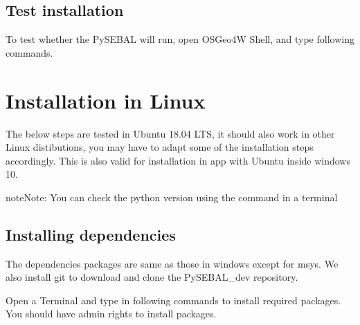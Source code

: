\documentclass[letterpaper,10pt,english]{sphinxmanual}
\begin{document}
\subsection{Test installation}
\label{\detokenize{installation:test-installation}}
To test whether the PySEBAL will run, open OSGeo4W Shell, and type following commands.

\begin{sphinxVerbatim}[commandchars=\\\{\},numbers=left,firstnumber=1,stepnumber=1]
 \PYGZbs{}
 
\end{sphinxVerbatim}


\section{Installation in Linux}
\label{\detokenize{installation:installation-in-linux}}
The below steps are tested in Ubuntu 18.04 LTS, it should also work in other Linux distibutions, you may have to adapt some of the installation steps accordingly. This is also valid for installation in  app with Ubuntu inside windows 10.

\begin{sphinxadmonition}{note}{Note:}
You can check the python version using the command  in a terminal
\end{sphinxadmonition}


\subsection{Installing dependencies}
\label{\detokenize{installation:id1}}
The dependencies packages are same as those in windows except for msys. We also install git to download and clone the PySEBAL\_dev repository.

Open a Terminal and type in following commands to install required packages. You should have admin rights to install packages.
\end{document}
